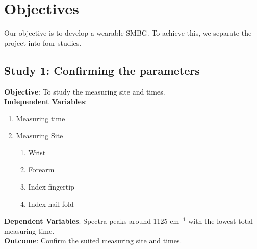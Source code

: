 
\section{Objectives}

Our objective is to develop a wearable SMBG.
To achieve this, we separate the project into four studies.

\subsection{Study 1: Confirming the parameters}

\textbf{Objective}: To study the measuring site and times.\\
\textbf{Independent Variables}: 
\begin{enumerate}
    \item Measuring time
    \item Measuring Site
    \begin{enumerate}
        \item Wrist
        \item Forearm
        \item Index fingertip
        \item Index nail fold
    \end{enumerate}
\end{enumerate}

\begin{sloppypar}
    \textbf{Dependent Variables}: Spectra peaks around 1125 $\text{cm}^{-1}$ with the lowest total measuring time.\\
    \textbf{Outcome}: Confirm the suited measuring site and times.
\end{sloppypar}

